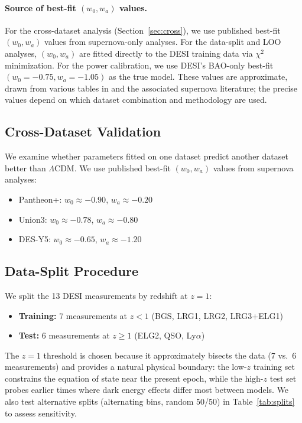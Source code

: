 \documentclass[11pt,a4paper]{article}
\newcommand{\LCDM}{$\Lambda$CDM}
\begin{document}
\paragraph{Source of best-fit $(w_0, w_a)$ values.} For the cross-dataset analysis (Section~\ref{sec:cross}), we use published best-fit $(w_0, w_a)$ values from supernova-only analyses. For the data-split and LOO analyses, $(w_0, w_a)$ are fitted directly to the DESI training data via $\chi^2$ minimization. For the power calibration, we use DESI's BAO-only best-fit $(w_0 = -0.75, w_a = -1.05)$ as the true model. These values are approximate, drawn from various tables in \citet{DESI2025} and the associated supernova literature; the precise values depend on which dataset combination and methodology are used.

\subsection{Cross-Dataset Validation}

We examine whether parameters fitted on one dataset predict another dataset better than \LCDM. We use published best-fit $(w_0, w_a)$ values from supernova analyses:
\begin{itemize}
    \item Pantheon+: $w_0 \approx -0.90$, $w_a \approx -0.20$
    \item Union3: $w_0 \approx -0.78$, $w_a \approx -0.80$
    \item DES-Y5: $w_0 \approx -0.65$, $w_a \approx -1.20$
\end{itemize}

\subsection{Data-Split Procedure}

We split the 13 DESI measurements by redshift at $z = 1$:
\begin{itemize}
    \item \textbf{Training:} 7 measurements at $z < 1$ (BGS, LRG1, LRG2, LRG3+ELG1)
    \item \textbf{Test:} 6 measurements at $z \geq 1$ (ELG2, QSO, Ly$\alpha$)
\end{itemize}

The $z = 1$ threshold is chosen because it approximately bisects the data (7 vs.\ 6 measurements) and provides a natural physical boundary: the low-$z$ training set constrains the equation of state near the present epoch, while the high-$z$ test set probes earlier times where dark energy effects differ most between models. We also test alternative splits (alternating bins, random 50/50) in Table~\ref{tab:splits} to assess sensitivity.
\end{document}
